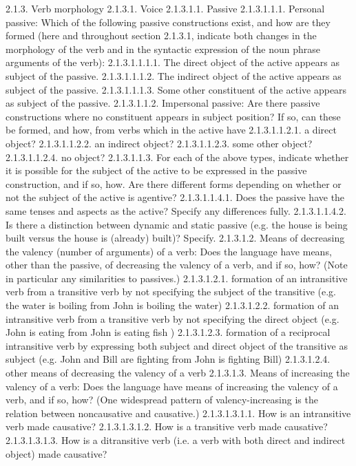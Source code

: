 2.1.3. Verb morphology
2.1.3.1. Voice
2.1.3.1.1. Passive
2.1.3.1.1.1. Personal passive: Which of the following passive constructions exist, and how are they formed (here and throughout section 2.1.3.1, indicate both changes in the morphology of the verb and in the syntactic expression of the noun phrase arguments of the verb):
2.1.3.1.1.1.1. The direct object of the active appears as subject of the passive.
2.1.3.1.1.1.2. The indirect object of the active appears as subject of the passive.
2.1.3.1.1.1.3. Some other constituent of the active appears as subject of the passive.
2.1.3.1.1.2. Impersonal passive: Are there passive constructions where no constituent appears in subject position? If so, can these be formed, and how, from verbs which in the active have
2.1.3.1.1.2.1. a direct object?
2.1.3.1.1.2.2. an indirect object?
2.1.3.1.1.2.3. some other object?
2.1.3.1.1.2.4. no object?
2.1.3.1.1.3. For each of the above types, indicate whether it is possible for the subject of the active to be expressed in the passive construction, and if so, how. Are there different forms depending on whether or not the subject of the active is agentive?
2.1.3.1.1.4.1. Does the passive have the same tenses and aspects as the active? Specify any differences fully.
2.1.3.1.1.4.2. Is there a distinction between dynamic and static passive (e.g. the house is being built versus the house is (already) built)? Specify.
2.1.3.1.2. Means of decreasing the valency (number of arguments) of a verb: Does the language have means, other than the passive, of decreasing the valency of a verb, and if so, how? (Note in particular any similarities to passives.)
2.1.3.1.2.1. formation of an intransitive verb from a transitive verb by not specifying the subject of the transitive (e.g. the water is boiling from John is boiling the water)
2.1.3.1.2.2. formation of an intransitive verb from a transitive verb by not specifying the direct object (e.g. John is eating from John is eating fish )
2.1.3.1.2.3. formation of a reciprocal intransitive verb by expressing both subject and direct object of the transitive as subject (e.g. John and Bill are fighting from John is fighting Bill)
2.1.3.1.2.4. other means of decreasing the valency of a verb
2.1.3.1.3. Means of increasing the valency of a verb: Does the language have means of increasing the valency of a verb, and if so, how? (One widespread pattern of valency-increasing is the relation between noncausative and causative.)
2.1.3.1.3.1.1. How is an intransitive verb made causative?
2.1.3.1.3.1.2. How is a transitive verb made causative?
2.1.3.1.3.1.3. How is a ditransitive verb (i.e. a verb with both direct and indirect object) made causative?
